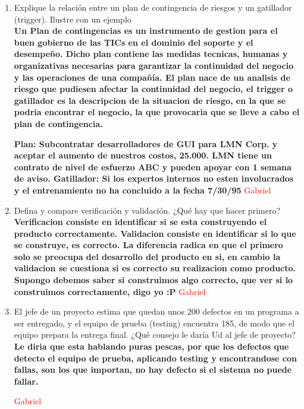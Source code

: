 \begin{enumerate}
	\item Explique la relación entre un plan de contingencia de riesgos y un gatillador (trigger). Ilustre con un ejemplo\\

	\textbf{Un Plan de contingencias es un instrumento de gestion para el buen gobierno de las TICs en el dominio del soporte y el desempe\~no. Dicho plan contiene las medidas tecnicas, humanas y organizativas necesarias para garantizar la continuidad del negocio y las operaciones de una compa\~n\'ia. El plan nace de un analisis de riesgo que pudiesen afectar la continuidad del negocio, el trigger o gatillador es la descripcion de la situacion de riesgo, en la que se podria encontrar el negocio, la que provocaria que se lleve a cabo el plan de contingencia.}

	\textbf{Plan: Subcontratar desarrolladores de GUI para LMN Corp. y aceptar el aumento de nuestros costos, 25.000. LMN tiene un contrato de nivel de esfuerzo ABC y pueden apoyar con 1 semana de aviso. Gatillador: Si los expertos internos no esten involucrados y el entrenamiento no ha concluido a la fecha 7/30/95}
	\textcolor{red}{Gabriel}

	\item Defina y compare verificación y validación. ¿Qué hay que hacer primero?\\
	\textbf{Verificacion consiste en identificar si se esta construyendo el producto correctamente. Validacion consiste en identificar si lo que se construye, es correcto. La diferencia radica en que el primero solo se preocupa del desarrollo del producto en si, en cambio la validacion se cuestiona si es correcto su realizacion como producto.}
	\textbf{Supongo debemos saber si construimos algo correcto, que ver si lo construimos correctamente, digo yo :P}
	\textcolor{red}{Gabriel}

	\item  El jefe de un proyecto estima que quedan unos 200 defectos en un programa a ser entregado, y el equipo de prueba (testing) encuentra 185, de modo que el equipo prepara la entrega final. ¿Qué consejo le daría Ud al jefe de proyecto?\\
	\textbf{Le diria que esta hablando puras pescas, por que los defectos que detecto el equipo de prueba, aplicando testing y encontrandose con fallas, son los que importan, no hay defecto si el sistema no puede fallar.}

	\textcolor{red}{Gabriel}


\end{enumerate}

